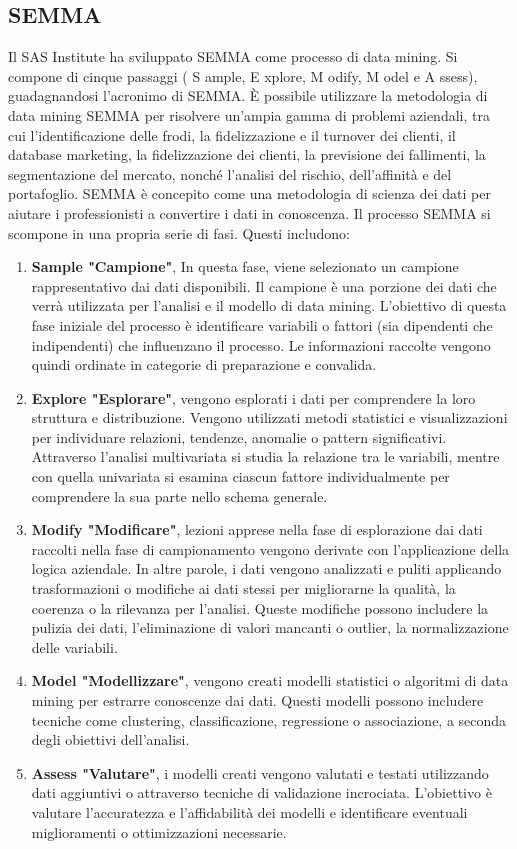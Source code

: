 \documentclass[italian,12pt,a4paper]{article}
\begin{document}
    \subsection{SEMMA}
    Il SAS Institute ha sviluppato SEMMA come processo di data mining. Si compone di cinque passaggi ( S ample, E xplore, M odify, M odel e A ssess), guadagnandosi l'acronimo di SEMMA. È possibile utilizzare la metodologia di data mining SEMMA per risolvere un'ampia gamma di problemi aziendali, tra cui l'identificazione delle frodi, la fidelizzazione e il turnover dei clienti, il database marketing, la fidelizzazione dei clienti, la previsione dei fallimenti, la segmentazione del mercato, nonché l'analisi del rischio, dell'affinità e del portafoglio. SEMMA è concepito come una metodologia di scienza dei dati per aiutare i professionisti a convertire i dati in conoscenza. Il processo SEMMA si scompone in una propria serie di fasi. Questi includono:

    \begin{enumerate}
		\item \textbf{Sample "Campione"}, In questa fase, viene selezionato un campione rappresentativo dai dati disponibili. Il campione è una porzione dei dati che verrà utilizzata per l'analisi e il modello di data mining. L'obiettivo di questa fase iniziale del processo è identificare variabili o fattori (sia dipendenti che indipendenti) che influenzano il processo. Le informazioni raccolte vengono quindi ordinate in categorie di preparazione e convalida.
		\item \textbf{Explore "Esplorare"}, vengono esplorati i dati per comprendere la loro struttura e distribuzione. Vengono utilizzati metodi statistici e visualizzazioni per individuare relazioni, tendenze, anomalie o pattern significativi. Attraverso l'analisi multivariata si studia la relazione tra le variabili, mentre con quella univariata si esamina ciascun fattore individualmente per comprendere la sua parte nello schema generale.
		\item \textbf{Modify "Modificare"}, lezioni apprese nella fase di esplorazione dai dati raccolti nella fase di campionamento vengono derivate con l'applicazione della logica aziendale. In altre parole, i dati vengono analizzati e puliti applicando trasformazioni o modifiche ai dati stessi per migliorarne la qualità, la coerenza o la rilevanza per l'analisi. Queste modifiche possono includere la pulizia dei dati, l'eliminazione di valori mancanti o outlier, la normalizzazione delle variabili.
		\item \textbf{Model "Modellizzare"}, vengono creati modelli statistici o algoritmi di data mining per estrarre conoscenze dai dati. Questi modelli possono includere tecniche come clustering, classificazione, regressione o associazione, a seconda degli obiettivi dell'analisi.
		\item \textbf{Assess "Valutare"}, i modelli creati vengono valutati e testati utilizzando dati aggiuntivi o attraverso tecniche di validazione incrociata. L'obiettivo è valutare l'accuratezza e l'affidabilità dei modelli e identificare eventuali miglioramenti o ottimizzazioni necessarie.
	\end{enumerate}
\end{document}
